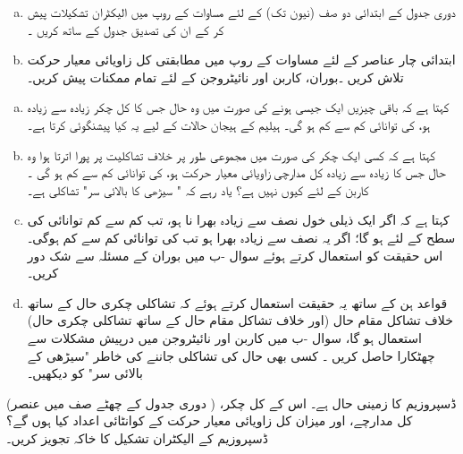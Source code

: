 \begin{enumerate}[a.]
\item
   دوری جدول کے ابتدائی  دو صف (نیون  تک)   کے لئے   مساوات   کے روپ میں  الیکٹران تشکیلات  پیش کر کے ان کی تصدیق جدول   کے ساتھ کریں ۔ 
   \item
  ابتدائی  چار عناصر  کے لئے مساوات     کے  روپ میں  مطابقتی کل زاویائی معیار حرکت تلاش کریں ۔بوران، کاربن اور نائیٹروجن کے لئے تمام ممکنات پیش کریں۔
  \end{enumerate}
\begin{enumerate}[a.]
\item
{} کہتا ہے کہ باقی چیزیں ایک جیسی  ہونے کی  صورت میں وہ حال جس کا کل چکر   زیادہ سے زیادہ ہو، کی توانائی کم سے کم   ہو گی۔ ہیلیم کے ہیجان حالات کے لیے یہ کیا    پیشنگوئی کرتا ہے۔
 \item
{} کہتا ہے کہ کسی ایک چکر کی صورت میں مجموعی طور پر خلاف تشاکلیت پر پورا اترتا ہوا   وہ حال جس کا زیادہ سے زیادہ کل   مدارچی زاویائی معیار حرکت     ہو،  کی توانائی کم سے کم ہو گی ۔ کاربن کے لئے   کیوں نہیں ہے؟  یاد رہے کہ  " سیڑھی کا بالائی سر"            تشاکلی ہے۔
\item
{} کہتا ہے کہ اگر ایک ذیلی خول             نصف سے زیادہ بھرا نا ہو، تب کم سے کم توانائی کی سطح کے لئے               ہو گا؛  اگر یہ نصف سے زیادہ بھرا ہو تب   کی توانائی کم سے کم ہوگی۔ اس حقیقت کو استعمال کرتے ہوئے سوال  -ب میں بوران کے مسئلہ سے شک دور کریں۔
\item
         قواعد ہن کے ساتھ یہ حقیقت استعمال کرتے ہوئے کہ تشاکلی چکری حال   کے ساتھ خلاف تشاکل مقام  حال  (اور خلاف تشاکل مقام حال کے ساتھ   تشاکلی چکری حال)  استعمال ہو گا،     سوال -ب میں کاربن اور نائیٹروجن  میں درپیش مشکلات سے چھٹکارا حاصل کریں ۔  کسی بھی حال کی تشاکلی جاننے کی خاطر "سیڑھی کے بالائی سر" کو دیکھیں۔
\end{enumerate}
  (دوری جدول کے چھٹے صف میں عنصر  )  ڈسپروزیم کا زمینی حال       ہے۔ اس کے کل چکر،  کل مدارچے،  اور میزان کل زاویائی معیار حرکت کے  کوانٹائی  اعداد  کیا ہوں گے؟ ڈسپروزیم کے الیکٹران  تشکیل  کا خاکہ تجویز کریں۔
  
